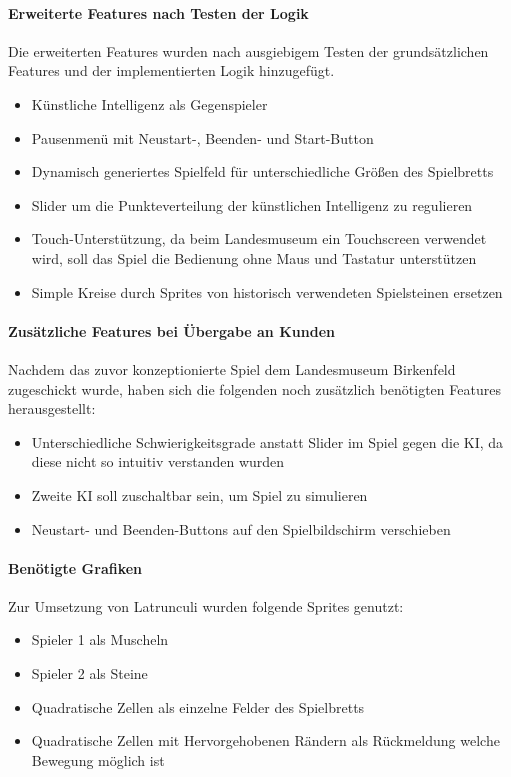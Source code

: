  \paragraph{Erweiterte Features nach Testen der Logik}
 Die erweiterten Features wurden nach ausgiebigem Testen der grundsätzlichen Features und der implementierten Logik hinzugefügt.
 \begin{itemize}
 \item Künstliche Intelligenz als Gegenspieler
 \item Pausenmenü mit Neustart-, Beenden- und Start-Button
 \item Dynamisch generiertes Spielfeld für unterschiedliche Größen des Spielbretts
 \item Slider um die Punkteverteilung der künstlichen Intelligenz zu regulieren
 \item Touch-Unterstützung, da beim Landesmuseum ein Touchscreen verwendet wird, soll das Spiel die Bedienung ohne Maus und Tastatur unterstützen
 \item Simple Kreise durch Sprites von historisch verwendeten Spielsteinen ersetzen
\end{itemize}


\paragraph{Zusätzliche Features bei Übergabe an Kunden}
Nachdem das zuvor konzeptionierte Spiel dem Landesmuseum Birkenfeld zugeschickt wurde, haben sich die folgenden noch zusätzlich benötigten Features herausgestellt:
\begin{itemize}
	\item Unterschiedliche Schwierigkeitsgrade anstatt Slider im Spiel gegen die KI, da diese nicht so intuitiv verstanden wurden
	\item Zweite KI soll zuschaltbar sein, um Spiel zu simulieren
	\item Neustart- und Beenden-Buttons auf den Spielbildschirm verschieben	
\end{itemize}


\paragraph{Benötigte Grafiken}
Zur Umsetzung von Latrunculi wurden folgende Sprites genutzt:
\begin{itemize}
	\item Spieler 1 als Muscheln
	\item Spieler 2 als Steine
	\item Quadratische Zellen als einzelne Felder des Spielbretts
	\item Quadratische Zellen mit Hervorgehobenen Rändern als Rückmeldung welche Bewegung möglich ist
\end{itemize}

